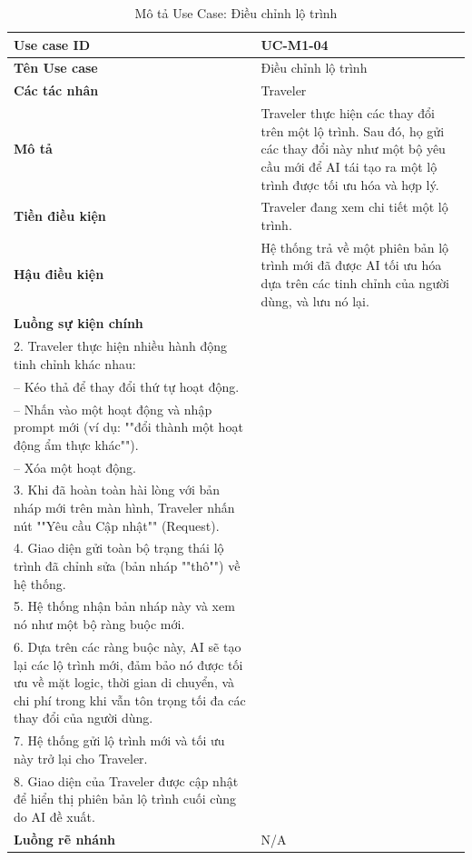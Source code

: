 \renewcommand{\arraystretch}{1.2}
\begin{longtable}{@{}p{4cm} p{11cm}@{}}
\caption{Mô tả Use Case: Điều chỉnh lộ trình}
\label{usecase-1-04} \\
\toprule
\textbf{Use case ID}       & UC-M1-04 \\ \midrule
\textbf{Tên Use case}      & Điều chỉnh lộ trình \\ \midrule
\textbf{Các tác nhân}      & Traveler \\ \midrule
\textbf{Mô tả}             & Traveler thực hiện các thay đổi trên một lộ trình. Sau đó, họ gửi các thay đổi này như một bộ yêu cầu mới để AI tái tạo ra một lộ trình được tối ưu hóa và hợp lý. \\ \midrule
\textbf{Tiền điều kiện}    & Traveler đang xem chi tiết một lộ trình. \\ \midrule
\textbf{Hậu điều kiện}     & Hệ thống trả về một phiên bản lộ trình mới đã được AI tối ưu hóa dựa trên các tinh chỉnh của người dùng, và lưu nó lại. \\ \midrule
\textbf{Luồng sự kiện chính} &
\begin{tabular}[t]{@{}p{10.5cm}@{}}
1. Traveler đang xem một lộ trình trên màn hình.\\
2. Traveler thực hiện nhiều hành động tinh chỉnh khác nhau:\\
– Kéo thả để thay đổi thứ tự hoạt động.\\
– Nhấn vào một hoạt động và nhập prompt mới (ví dụ: ""đổi thành một hoạt động ẩm thực khác"").\\
– Xóa một hoạt động.\\
3. Khi đã hoàn toàn hài lòng với bản nháp mới trên màn hình, Traveler nhấn nút ""Yêu cầu Cập nhật"" (Request).\\
4. Giao diện gửi toàn bộ trạng thái lộ trình đã chỉnh sửa (bản nháp ""thô"") về hệ thống.\\
5. Hệ thống nhận bản nháp này và xem nó như một bộ ràng buộc mới.\\
6. Dựa trên các ràng buộc này, AI sẽ tạo lại các lộ trình mới, đảm bảo nó được tối ưu về mặt logic, thời gian di chuyển, và chi phí trong khi vẫn tôn trọng tối đa các thay đổi của người dùng.\\
7. Hệ thống gửi lộ trình mới và tối ưu này trở lại cho Traveler.\\
8. Giao diện của Traveler được cập nhật để hiển thị phiên bản lộ trình cuối cùng do AI đề xuất.
\end{tabular} \\ \midrule
\textbf{Luồng rẽ nhánh}    & N/A \\ \midrule

\end{longtable}
